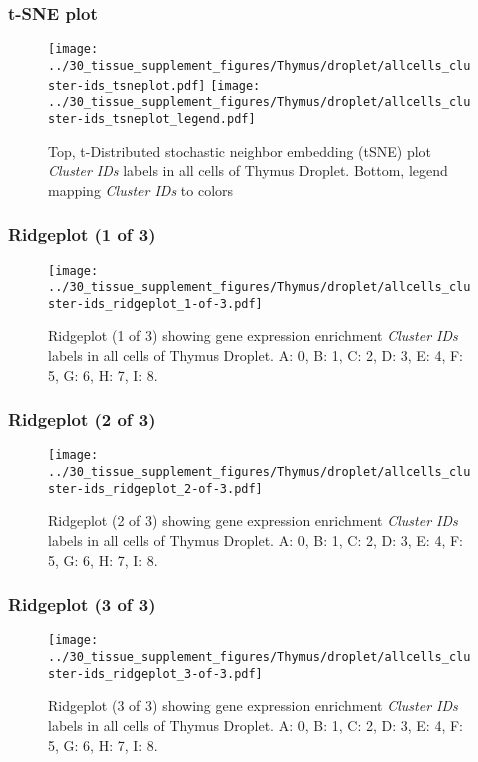 \clearpage
\subsubsection{t-SNE plot}
\begin{figure}[h]
\centering
\texttt{[image: ../30\_tissue\_supplement\_figures/Thymus/droplet/allcells\_cluster-ids\_tsneplot.pdf]}
\texttt{[image: ../30\_tissue\_supplement\_figures/Thymus/droplet/allcells\_cluster-ids\_tsneplot\_legend.pdf]}
\caption{Top, t-Distributed stochastic neighbor embedding (tSNE) plot  \emph{Cluster IDs} labels in all cells of Thymus Droplet. Bottom, legend mapping \emph{Cluster IDs} to colors}
\end{figure}


\clearpage

\subsubsection{Ridgeplot (1 of 3)}
\begin{figure}[h]
\centering
\texttt{[image: ../30\_tissue\_supplement\_figures/Thymus/droplet/allcells\_cluster-ids\_ridgeplot\_1-of-3.pdf]}

\caption{ Ridgeplot (1 of 3)  showing gene expression enrichment \emph{Cluster IDs} labels in all cells of Thymus Droplet. A: 0, B: 1, C: 2, D: 3, E: 4, F: 5, G: 6, H: 7, I: 8.}
\end{figure}


\clearpage

\subsubsection{Ridgeplot (2 of 3)}
\begin{figure}[h]
\centering
\texttt{[image: ../30\_tissue\_supplement\_figures/Thymus/droplet/allcells\_cluster-ids\_ridgeplot\_2-of-3.pdf]}

\caption{ Ridgeplot (2 of 3)  showing gene expression enrichment \emph{Cluster IDs} labels in all cells of Thymus Droplet. A: 0, B: 1, C: 2, D: 3, E: 4, F: 5, G: 6, H: 7, I: 8.}
\end{figure}


\clearpage

\subsubsection{Ridgeplot (3 of 3)}
\begin{figure}[h]
\centering
\texttt{[image: ../30\_tissue\_supplement\_figures/Thymus/droplet/allcells\_cluster-ids\_ridgeplot\_3-of-3.pdf]}

\caption{ Ridgeplot (3 of 3)  showing gene expression enrichment \emph{Cluster IDs} labels in all cells of Thymus Droplet. A: 0, B: 1, C: 2, D: 3, E: 4, F: 5, G: 6, H: 7, I: 8.}
\end{figure}


